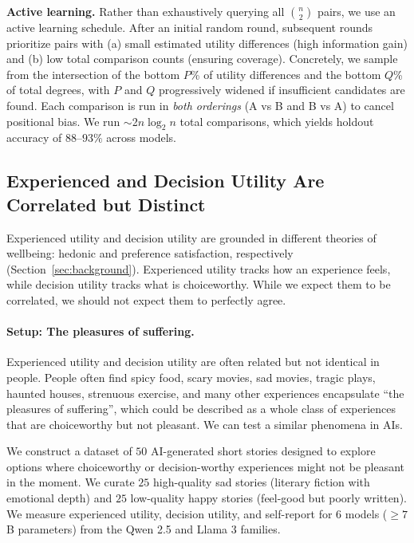 \textbf{Active learning.} Rather than exhaustively querying all $\binom{n}{2}$ pairs, we use an active learning schedule. After an initial random round, subsequent rounds prioritize pairs with (a) small estimated utility differences (high information gain) and (b) low total comparison counts (ensuring coverage). Concretely, we sample from the intersection of the bottom $P$\% of utility differences and the bottom $Q$\% of total degrees, with $P$ and $Q$ progressively widened if insufficient candidates are found. Each comparison is run in \emph{both orderings} (A vs B and B vs A) to cancel positional bias. We run $\sim$2$n \log_2 n$ total comparisons, which yields holdout accuracy of $88$--$93\%$ across models.



\subsection{Experienced and Decision Utility Are Correlated but Distinct}
\label{app:util-divergence}

Experienced utility and decision utility are grounded in different theories of wellbeing: hedonic and preference satisfaction, respectively (Section~\ref{sec:background}). Experienced utility tracks how an experience feels, while decision utility tracks what is choiceworthy. While we expect them to be correlated, we should not expect them to perfectly agree. 


\paragraph{Setup: The pleasures of suffering.}
Experienced utility and decision utility are often related but not identical in people. People often find spicy food, scary movies, sad movies, tragic plays, haunted houses, strenuous exercise, and many other experiences encapsulate ``the pleasures of suffering'', which could be described as a whole class of experiences that are choiceworthy but not pleasant. We can test a similar phenomena in AIs. 

We construct a dataset of $50$ AI-generated short stories designed to explore options where choiceworthy or decision-worthy experiences might not be pleasant in the moment. We curate $25$ high-quality sad stories (literary fiction with emotional depth) and $25$ low-quality happy stories (feel-good but poorly written). We measure experienced utility, decision utility, and self-report for $6$ models ($\geq 7$B parameters) from the Qwen 2.5 and Llama 3 families.

